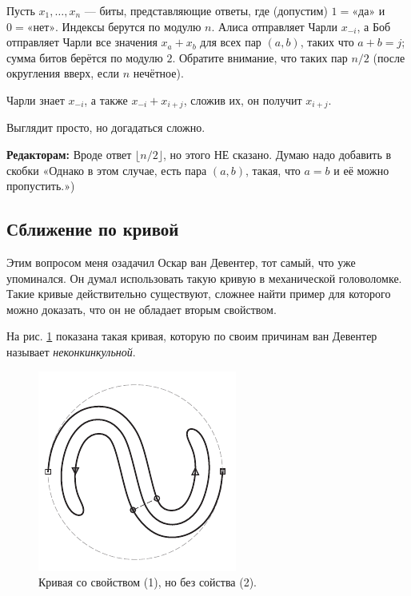 Пусть $x_1, \dots , x_n$ --- биты, представляющие ответы, где (допустим) $1 = \text{«да»}$ и $0 = \text{«нет»}$.
Индексы берутся по модулю $n$.
Алиса отправляет Чарли $x_{-i}$,
а Боб отправляет Чарли все значения $x_a + x_b$ для всех пар $(a, b)$, таких что $a + b = j$;
сумма битов берётся по модулю $2$.
Обратите внимание, что таких пар $n/2$ (после округления вверх, если $n$ нечётное).

Чарли знает $x_{-i}$, а также $x_{-i} + x_{i+j}$, сложив их, он получит $x_{i+j}$.

Выглядит просто, но догадаться сложно.

\begin{addedbytheeditors}
\textbf{Редакторам:} Вроде ответ $\lfloor n/2\rfloor$, но этого НЕ сказано.
Думаю надо добавить в скобки «Однако в этом случае, есть пара $(a,b)$, такая, что $a=b$ и её можно пропустить.»)
\end{addedbytheeditors}

\subsection*{Сближение по кривой}

Этим вопросом меня озадачил Оскар ван Девентер, тот самый, что уже упоминался.
Он думал использовать такую кривую в механической головоломке.
Такие кривые действительно существуют, сложнее найти пример для которого можно доказать, что он не обладает вторым свойством.

На рис. \ref{pic:ss-curve} показана такая кривая, которую по своим причинам ван Девентер называет \emph{неконкинкульной}.

\begin{figure}[htb!]
\centering
\includegraphics[scale=1]{pics/ss-curve}
\caption{Кривая со свойством (1), но без сойства (2).}
\label{pic:ss-curve}
\end{figure}

